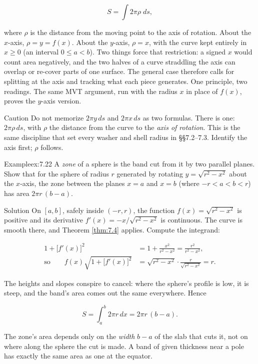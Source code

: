 \documentclass[a4paper,12pt,oneside]{memoir}
\begin{document}
\[ S = \int 2\pi \rho\;ds, \]

where \(\rho\) is the distance from the moving point to the axis of rotation. About the \(x\)-axis, \(\rho = y = f(x)\). About the \emph{\(y\)}-axis, \(\rho = x\), with the curve kept entirely in \(x \ge 0\) (an interval \(0 \le a < b\)). Two things force that restriction: a signed \(x\) would count area negatively, and the two halves of a curve straddling the axis can overlap or re-cover parts of one surface. The general case therefore calls for splitting at the axis and tracking what each piece generates. One principle, two readings. The same MVT argument, run with the radius \(x\) in place of \(f(x)\), proves the \(y\)-axis version.

\begin{envcaution}{Caution}{}{}
Do not memorize \(2\pi y\,ds\) and \(2\pi x\,ds\) as two formulas. There is one: \(2\pi \rho\,ds\), with \(\rho\) the distance from the curve to the \emph{axis of rotation}. This is the same discipline that set every washer and shell radius in §§7.2–7.3. Identify the axis first; \(\rho\) follows.
\end{envcaution}
\begin{workedexample}
\begin{envexample}{Example}{ex:7.22}{}
A \emph{zone} of a sphere is the band cut from it by two parallel planes. Show that for the sphere of radius \(r\) generated by rotating \(y = \sqrt{r^{2} - x^{2}}\) about the \(x\)-axis, the zone between the planes \(x = a\) and \(x = b\) (where \(-r < a < b < r\)) has area \(2\pi r\,(b - a)\).
\end{envexample}
\begin{envsolution}{Solution}{}{}
On \([a, b]\), safely inside \((-r, r)\), the function \(f(x) = \sqrt{r^{2} - x^{2}}\) is positive and its derivative \(f'(x) = -x/\sqrt{r^{2} - x^{2}}\) is continuous. The curve is smooth there, and Theorem \ref{thm:7.4} applies. Compute the integrand:

\[ \begin{aligned}
          1 + \bigl[f'(x)\bigr]^{2} &= 1 + \frac{x^{2}}{r^{2} - x^{2}} = \frac{r^{2}}{r^{2} - x^{2}}, \\[2pt]
          \text{so}\qquad f(x)\sqrt{1 + \bigl[f'(x)\bigr]^{2}} &= \sqrt{r^{2} - x^{2}}\cdot\frac{r}{\sqrt{r^{2} - x^{2}}} = r.
        \end{aligned} \]

The heights and slopes conspire to cancel: where the sphere’s profile is low, it is steep, and the band’s area comes out the same everywhere. Hence

\[ S = \int_{a}^{b} 2\pi r\,dx = 2\pi r\,(b - a). \]

The zone’s area depends only on the \emph{width} \(b - a\) of the slab that cuts it, not on where along the sphere the cut is made. A band of given thickness near a pole has exactly the same area as one at the equator. \qedmark
\end{envsolution}
\end{workedexample}
\end{document}
